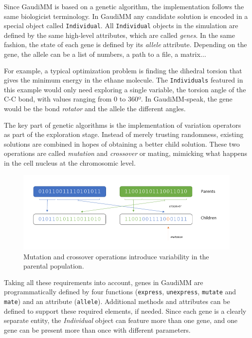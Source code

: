 Since GaudiMM is based on a genetic algorithm, the implementation follows the same biologicist terminology. In GaudiMM any candidate solution is encoded in a special object called \texttt{Individual}. All \texttt{Individual} objects in the simulation are defined by the same high-level attributes, which are called \textit{genes}. In the same fashion, the state of each gene is defined by its \textit{allele} attribute. Depending on the gene, the allele can be a list of numbers, a path to a file, a matrix$ \ldots $

For example, a typical optimization problem is finding the dihedral torsion that gives the minimum energy in the ethane molecule. The \texttt{Individuals} featured in this example would only need exploring a single variable, the torsion angle of the C-C bond, with values ranging from 0 to 360º. In GaudiMM-speak, the gene would be the bond \textit{rotator} and the allele the different angles.

The key part of genetic algorithms is the implementation of variation operators as part of the exploration stage. Instead of merely trusting randomness, existing solutions are combined in hopes of obtaining a better child solution. These two operations are called \textit{mutation} and \textit{crossover} or mating, mimicking what happens in the cell nucleus at the chromosomic level.


\begin{figure}[H] %
	\includegraphics[width=\textwidth]{./figures/04/ga-crossover-mut.png}
	\caption[Mutation and crossover]{Mutation and crossover operations introduce variability in the parental population.}
	\label{fig:cxmut}
\end{figure}

Taking all these requirements into account, genes in GaudiMM are programmatically defined by four functions (\texttt{express}, \texttt{unexpress}, \texttt{mutate} and \texttt{mate}) and an attribute (\texttt{allele}). Additional methods and attributes can be defined to support these required elements, if needed. Since each gene is a clearly separate entity, the \textit{Individual} object can feature more than one gene, and one gene can be present more than once with different parameters.

